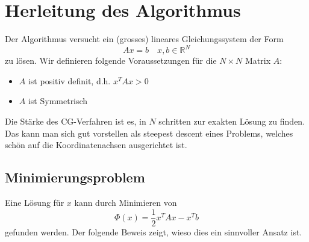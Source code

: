 \section{Herleitung des Algorithmus}
\label{cg:section:herleitung}

Der Algorithmus versucht ein (grosses) lineares Gleichungssystem der Form
\begin{equation}
	Ax = b \quad x, b \in \mathbb{R}^N
\end{equation}
zu lösen.
Wir definieren folgende Voraussetzungen für die $N\times N$ Matrix $A$:
\begin{itemize}
	\item $A$ ist positiv definit, d.h. $x^T A x > 0$
	\item $A$ ist Symmetrisch
\end{itemize}
Die Stärke des CG-Verfahren ist es, in $N$ schritten zur exakten Lösung zu finden.
Das kann man sich gut vorstellen als steepest descent eines Problems, welches schön auf die Koordinatenachsen ausgerichtet ist. %

\subsection{Minimierungsproblem \label{cg:subsection:Minimierungsproblem}}

Eine Lösung für $x$ kann durch Minimieren von
\begin{equation}
	\Phi(x) = \frac{1}{2} x^T A x - x^T b
\end{equation}
gefunden werden.
Der folgende Beweis zeigt, wieso dies ein sinnvoller Ansatz ist.

